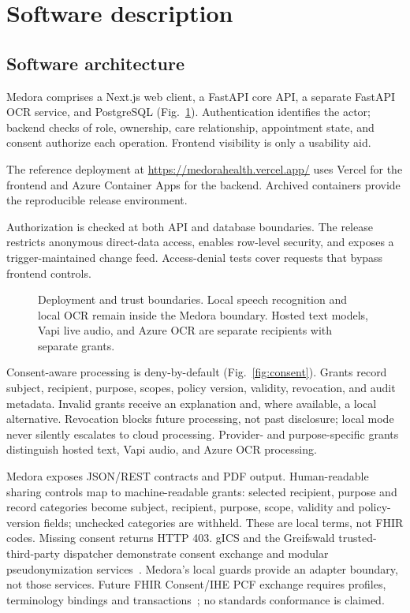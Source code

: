 \documentclass[preprint,12pt,a4paper]{elsarticle}
\begin{document}
\section{Software description}

\subsection{Software architecture}

Medora comprises a Next.js web client, a FastAPI core API, a separate FastAPI OCR service,
and PostgreSQL (Fig.~\ref{fig:trust}). Authentication identifies the actor; backend checks
of role, ownership, care relationship, appointment state, and consent authorize each
operation. Frontend visibility is only a usability aid.

The reference deployment at \url{https://medorahealth.vercel.app/} uses Vercel for the
frontend and Azure Container Apps for the backend. Archived containers provide the
reproducible release environment.

Authorization is checked at both API and database boundaries. The release restricts
anonymous direct-data access, enables row-level security, and exposes a trigger-maintained
change feed. Access-denial tests cover requests that bypass frontend controls.

\begin{figure}[!htbp]
\centering\resizebox{\textwidth}{!}{}
\caption{Deployment and trust boundaries. Local speech recognition and local OCR remain
inside the Medora boundary. Hosted text models, Vapi live audio, and Azure OCR are separate
recipients with separate grants.}
\label{fig:trust}
\end{figure}

Consent-aware processing is deny-by-default (Fig.~\ref{fig:consent}). Grants record subject,
recipient, purpose, scopes, policy version, validity, revocation, and audit metadata. Invalid
grants receive an explanation and, where available, a local alternative. Revocation blocks
future processing, not past disclosure; local mode never silently escalates to cloud processing. Provider-
and purpose-specific grants distinguish hosted text, Vapi audio, and Azure OCR processing.

Medora exposes JSON/REST contracts and PDF output. Human-readable sharing controls map
to machine-readable grants: selected recipient, purpose and record categories become
subject, recipient, purpose, scope, validity and policy-version fields; unchecked
categories are withheld. These are local terms, not FHIR codes. Missing consent returns HTTP 403.
gICS and the Greifswald trusted-third-party dispatcher demonstrate consent exchange and
modular pseudonymization services~\cite{gics2022,ttp2024}. Medora's local guards provide an
adapter boundary, not those services. Future FHIR Consent/IHE PCF exchange requires profiles,
terminology bindings and transactions~\cite{fhirconsent,ihepcf,consent2025}; no standards
conformance is claimed.
\end{document}
